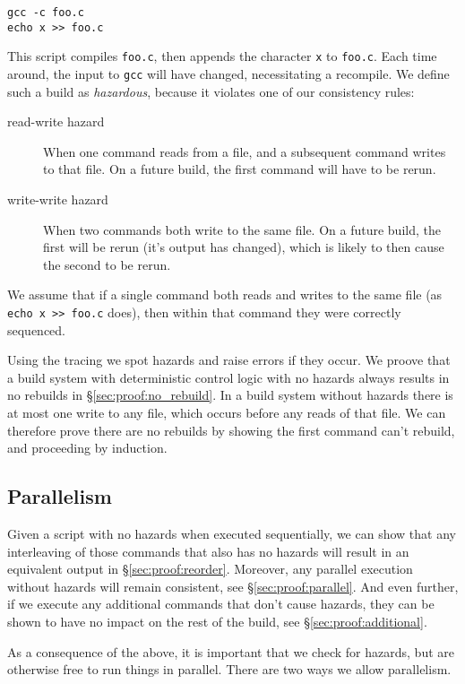 \begin{verbatim}
gcc -c foo.c
echo x >> foo.c
\end{verbatim}

This script compiles \texttt{foo.c}, then appends the character \texttt{x} to \texttt{foo.c}. Each time around, the input to \texttt{gcc} will have changed, necessitating a recompile. We define such a build as \emph{hazardous}, because it violates one of our consistency rules:

\begin{description}
\item[read-write hazard] When one command reads from a file, and a subsequent command writes to that file. On a future build, the first command will have to be rerun.
\item[write-write hazard] When two commands both write to the same file. On a future build, the first will be rerun (it's output has changed), which is likely to then cause the second to be rerun.
\end{description}

We assume that if a single command both reads and writes to the same file (as \texttt{echo x >> foo.c} does), then within that command they were correctly sequenced.

Using the tracing we spot hazards and raise errors if they occur. We proove that a build system with deterministic control logic with no hazards always results in no rebuilds in \S\ref{sec:proof:no_rebuild}. In a build system without hazards there is at most one write to any file, which occurs before any reads of that file. We can therefore prove there are no rebuilds by showing the first command can't rebuild, and proceeding by induction.

\subsection{Parallelism}

Given a script with no hazards when executed sequentially, we can show that any interleaving of those commands that also has no hazards will result in an equivalent output in \S\ref{sec:proof:reorder}. Moreover, any parallel execution without hazards will remain consistent, see \S\ref{sec:proof:parallel}. And even further, if we execute any additional commands that don't cause hazards, they can be shown to have no impact on the rest of the build, see \S\ref{sec:proof:additional}.

As a consequence of the above, it is important that we check for hazards, but are otherwise free to run things in parallel. There are two ways we allow parallelism.

